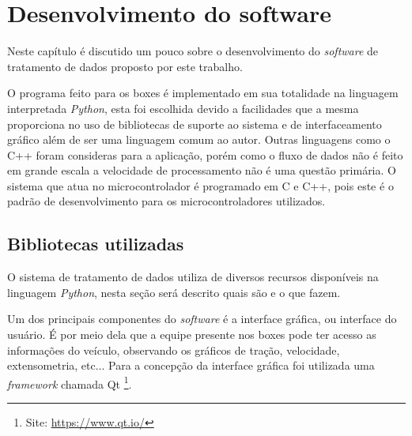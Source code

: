 \chapter{Desenvolvimento do software}
	\label{ch:desenvolvimento}
Neste capítulo é discutido um pouco sobre o desenvolvimento do \textit{software} de tratamento de dados proposto por este trabalho. 

O programa feito para os boxes é implementado em sua totalidade na linguagem interpretada \textit{Python}, esta foi escolhida devido a facilidades que a mesma proporciona no uso de bibliotecas de suporte ao sistema e de interfaceamento gráfico além de ser uma linguagem comum ao autor. Outras linguagens como o C++ foram consideras para a aplicação, porém como o fluxo de dados não é feito em grande escala a velocidade de processamento não é uma questão primária. O sistema que atua no microcontrolador é programado em C e C++, pois este é o padrão de desenvolvimento para os microcontroladores utilizados. 

\section{Bibliotecas utilizadas}
O sistema de tratamento de dados utiliza de diversos recursos disponíveis na linguagem \textit{Python}, nesta seção será descrito quais são e o que fazem. 

Um dos principais componentes do \textit{software} é a interface gráfica, ou interface do usuário. É por meio dela que a equipe presente nos boxes pode ter acesso as informações do veículo, observando os gráficos de tração, velocidade, extensometria, etc... Para a concepção da interface gráfica foi utilizada uma \textit{framework} chamada Qt \footnote[1]{Site: \url{https://www.qt.io/}}.